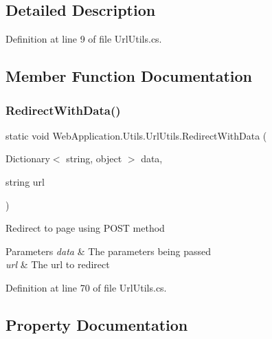 \subsection{Detailed Description}


Definition at line 9 of file Url\+Utils.\+cs.



\subsection{Member Function Documentation}
\mbox{\label{classWebApplication_1_1Utils_1_1UrlUtils_a1de7db509a7a00d84a4f064107a224f0}} 
\subsubsection{\texorpdfstring{RedirectWithData()}{RedirectWithData()}}
{\footnotesize\ttfamily static void Web\+Application.\+Utils.\+Url\+Utils.\+Redirect\+With\+Data (\begin{DoxyParamCaption}\item[{Dictionary$<$ string, object $>$}]{data,  }\item[{string}]{url }\end{DoxyParamCaption})\hspace{0.3cm}{\ttfamily [static]}}



Redirect to page using P\+O\+ST method 


\begin{DoxyParams}{Parameters}
{\em data} & The parameters being passed\\
\hline
{\em url} & The url to redirect\\
\hline
\end{DoxyParams}


Definition at line 70 of file Url\+Utils.\+cs.



\subsection{Property Documentation}
\mbox{\label{classWebApplication_1_1Utils_1_1UrlUtils_ae9c551be3f6495bbcfedd6e2de4a596f}} 

